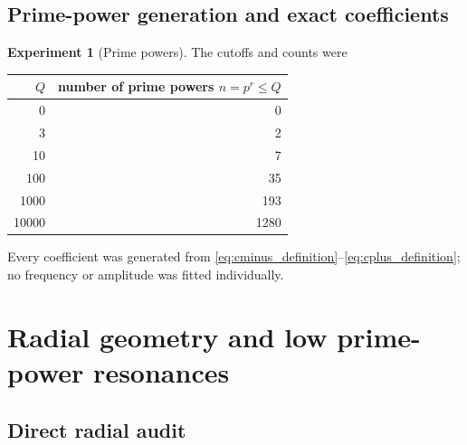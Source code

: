 \documentclass[11pt]{amsart}
\numberwithin{equation}{section}
\theoremstyle{plain}
\theoremstyle{definition}
\newtheorem{experiment}[theorem]{Experiment}
\theoremstyle{remark}
\newcommand{\1}{\mathbf{1}}
\begin{document}
\subsection{Prime-power generation and exact coefficients}
\label{subsec:numerical_prime_powers}

\begin{experiment}[Prime powers]
\label{exp:numerical_prime_power_counts}
The cutoffs and counts were
\begin{center}
\begin{tabular}{rr}
\toprule
$Q$ & number of prime powers $n=p^r\leq Q$\\
\midrule
0 & 0\\
3 & 2\\
10 & 7\\
100 & 35\\
1000 & 193\\
10000 & 1280\\
\bottomrule
\end{tabular}
\end{center}
Every coefficient was generated from
\eqref{eq:cminus_definition}--\eqref{eq:cplus_definition}; no frequency or
amplitude was fitted individually.
\end{experiment}

\section{Radial geometry and low prime-power resonances}
\label{sec:numerical_radial_geometry}

\subsection{Direct radial audit}
\label{subsec:direct_radial_audit}
\end{document}
